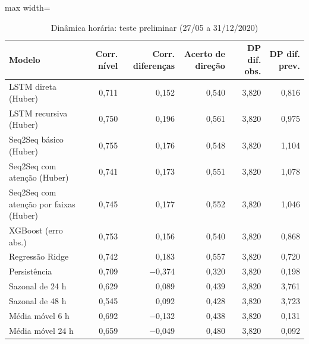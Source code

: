 \begin{table}[!htbp]
    \centering
    \caption{Dinâmica horária: teste preliminar (27/05 a 31/12/2020)}
    \label{tab:dinamica_teste_historico}
    \small
    \begin{adjustbox}{max width=\textwidth}
    \begin{tabular}{lrrrrr}
        \toprule
        Modelo & Corr. nível & Corr. diferenças & Acerto de direção & DP dif. obs. & DP dif. prev. \\
        \midrule
        LSTM direta (Huber) & 0,711 & 0,152 & 0,540 & 3,820 & 0,816 \\
        LSTM recursiva (Huber) & 0,750 & 0,196 & 0,561 & 3,820 & 0,975 \\
        Seq2Seq básico (Huber) & 0,755 & 0,176 & 0,548 & 3,820 & 1,104 \\
        Seq2Seq com atenção (Huber) & 0,741 & 0,173 & 0,551 & 3,820 & 1,078 \\
        Seq2Seq com atenção por faixas (Huber) & 0,745 & 0,177 & 0,552 & 3,820 & 1,046 \\
        XGBoost (erro abs.) & 0,753 & 0,156 & 0,540 & 3,820 & 0,868 \\
        Regressão Ridge & 0,742 & 0,183 & 0,557 & 3,820 & 0,720 \\
        \midrule
        Persistência & 0,709 & $-$0,374 & 0,320 & 3,820 & 0,198 \\
        Sazonal de 24 h & 0,629 & 0,089 & 0,439 & 3,820 & 3,761 \\
        Sazonal de 48 h & 0,545 & 0,092 & 0,428 & 3,820 & 3,723 \\
        Média móvel 6 h & 0,692 & $-$0,132 & 0,438 & 3,820 & 0,131 \\
        Média móvel 24 h & 0,659 & $-$0,049 & 0,480 & 3,820 & 0,092 \\
        \bottomrule
    \end{tabular}
    \end{adjustbox}
\end{table}
